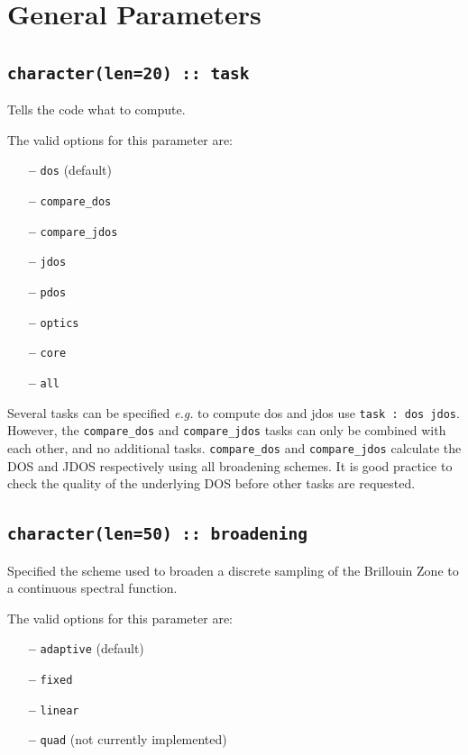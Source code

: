 \documentclass[a4paper,11pt,twoside]{book}
\begin{document}
{\clearpage


\section{General Parameters}
\subsection[task]{\tt character(len=20) :: task}

Tells the code what to compute. 

The valid options for this parameter are:
\begin{itemize}
\item[{\bf --}]  \verb#dos# (default)
\item[{\bf --}]  \verb#compare_dos#
\item[{\bf --}]  \verb#compare_jdos#
\item[{\bf --}]  \verb#jdos#
\item[{\bf --}]  \verb#pdos#
\item[{\bf --}]  \verb#optics#
\item[{\bf --}]  \verb#core#
\item[{\bf --}]  \verb#all#
\end{itemize}
Several tasks can be specified \emph{e.g.} to compute dos and jdos use
\verb#task : dos jdos#.  
However, the \verb#compare_dos# and \verb#compare_jdos# tasks can only be combined with each other, and no additional tasks.
\verb#compare_dos# and \verb#compare_jdos# calculate the DOS and JDOS respectively using all broadening schemes. It is good practice to check the quality of the underlying DOS before other tasks are requested. 

\subsection[broadening]{\tt character(len=50) :: broadening}

Specified the scheme used to broaden a discrete sampling of the
Brillouin Zone to a continuous spectral function.

The valid options for this parameter are:
\begin{itemize}
\item[{\bf --}]  \verb#adaptive# (default)
\item[{\bf --}]  \verb#fixed#
\item[{\bf --}]  \verb#linear#
\item[{\bf --}]  \verb#quad# (not currently implemented)
\end{itemize}

}
\end{document}
